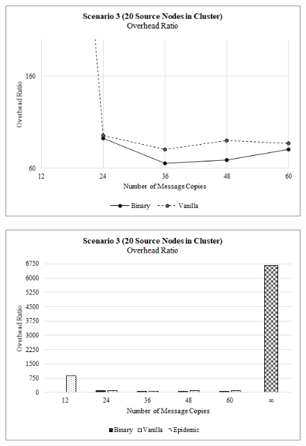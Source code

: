 \documentclass{article}
\begin{document}
\begin{figure}[h!]
\centering
\begin{minipage}[t]{.5\textwidth}
  \centering
  \includegraphics[width=.98\linewidth]{Results/Graphs/OverheadRatio/S3_OverheadRatio_SprayAndWaitComparison.png}
  \label{fig:test1}
\end{minipage}%
\begin{minipage}[t]{.5\textwidth}
  \centering
  \includegraphics[width=.98\linewidth]{Results/Graphs/OverheadRatio/S3_OverheadRatio_AllComparison.png}
  \label{fig:test2}
\end{minipage}


\end{figure}
\end{document}
